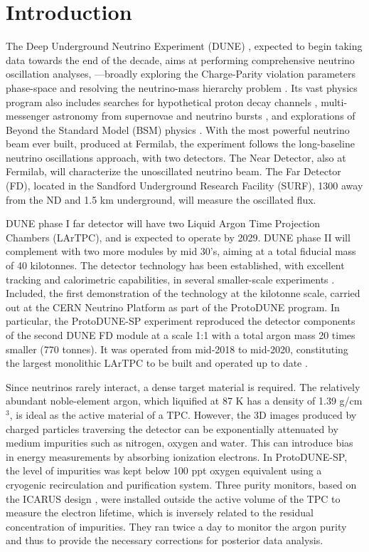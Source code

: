 \section{Introduction}
\label{sec:introduction}

\noindent The Deep Underground Neutrino Experiment (DUNE) \cite{dune_tdr1}, expected to begin taking data towards the end of the decade, aims at performing comprehensive neutrino oscillation analyses, ---broadly exploring the Charge-Parity violation parameters phase-space and resolving the neutrino-mass hierarchy problem \cite{bib:dune_osc}. Its vast physics program also includes searches for hypothetical proton decay channels \cite{bib:dune_tdr2}, multi-messenger astronomy from supernovae and neutrino bursts \cite{bib:dune_supernova}, and explorations of Beyond the Standard Model (BSM) physics \cite{bib:dune_bsm}. With the most powerful neutrino beam ever built, produced at Fermilab, the experiment follows the long-baseline neutrino oscillations approach, with two detectors. The Near Detector, also at Fermilab, will characterize the unoscillated neutrino beam. The Far Detector (FD), located in the Sandford Underground Research Facility (SURF), 1300 away from the ND and 1.5 km underground, will measure the oscillated flux.

DUNE phase I far detector will have two Liquid Argon Time Projection Chambers (LArTPC), and is expected to operate by 2029. DUNE phase II will complement with two more modules by mid 30's, aiming at a total fiducial mass of 40 kilotonnes. The detector technology has been established, with excellent tracking and calorimetric capabilities, in several smaller-scale experiments \cite{icarus,microboone}. Included, the first demonstration of the technology at the kilotonne scale, carried out at the CERN Neutrino Platform as part of the ProtoDUNE program. In particular, the ProtoDUNE-SP experiment \cite{pdsp_tdr} reproduced the detector components of the second DUNE FD module \cite{dune_tdr4} at a scale 1:1 with a total argon mass 20 times smaller (770 tonnes). It was operated from mid-2018 to mid-2020, constituting the largest monolithic LArTPC to be built and operated up to date \cite{pdsp_1,pdsp_2}.

Since neutrinos rarely interact, a dense target material is required. The relatively abundant noble-element argon, which liquified at 87 K has a density of 1.39 g/cm$^{3}$, is ideal as the active material of a TPC. However, the 3D images produced by charged particles traversing the detector can be exponentially attenuated by medium impurities such as nitrogen, oxygen and water. This can introduce bias in energy measurements by absorbing ionization electrons. In ProtoDUNE-SP, the level of impurities was kept below 100 ppt oxygen equivalent \cite{pdsp_tdr} using a cryogenic recirculation and purification system. Three purity monitors, based on the ICARUS design \cite{PrMs}, were installed outside the active volume of the TPC to measure the electron lifetime, which is inversely related to the residual concentration of impurities. They ran twice a day to monitor the argon purity and thus to provide the necessary corrections for posterior data analysis. 

